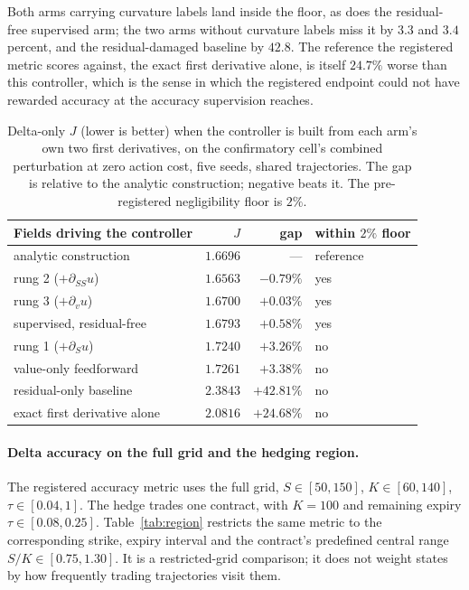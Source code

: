 \documentclass{article}
\begin{document}
Both arms carrying curvature labels land inside the floor, as does the residual-free
supervised arm; the two arms without curvature labels miss it by $3.3$ and $3.4$
percent, and the residual-damaged baseline by $42.8$. The reference the registered
metric scores against, the exact first derivative alone, is itself $24.7\%$ worse
than this controller, which is the sense in which the registered endpoint could
not have rewarded accuracy at the accuracy supervision reaches.

\begin{table}[!htbp]
\caption{Delta-only $J$ (lower is better) when the controller is built from each
arm's own two first derivatives, on the confirmatory cell's combined perturbation
at zero action cost, five seeds,
shared trajectories. The gap is relative to the analytic construction; negative
beats it. The pre-registered negligibility floor is $2\%$.}
\label{tab:mv-s2s}
\centering\footnotesize\setlength{\tabcolsep}{6pt}
\begin{tabular}{@{}lrrl@{}}
\toprule
Fields driving the controller & $J$ & gap & within $2\%$ floor \\
\midrule
analytic construction & $1.6696$ & --- & reference \\
rung 2 ($+\partial_{SS}u$) & $\mathbf{1.6563}$ & $-0.79\%$ & yes \\
rung 3 ($+\partial_v u$) & $1.6700$ & $+0.03\%$ & yes \\
supervised, residual-free & $1.6793$ & $+0.58\%$ & yes \\
rung 1 ($+\partial_S u$) & $1.7240$ & $+3.26\%$ & no \\
value-only feedforward & $1.7261$ & $+3.38\%$ & no \\
residual-only baseline & $2.3843$ & $+42.81\%$ & no \\
\midrule
exact first derivative alone & $2.0816$ & $+24.68\%$ & no \\
\bottomrule
\end{tabular}
\end{table}

\paragraph{Delta accuracy on the full grid and the hedging region.}
The registered accuracy metric uses the full grid, $S\in[50,150]$,
$K\in[60,140]$, $\tau\in[0.04,1]$. The hedge trades one contract, with $K=100$
and remaining expiry $\tau\in[0.08,0.25]$. Table~\ref{tab:region} restricts the
same metric to the corresponding strike, expiry interval and the contract's
predefined central range $S/K\in[0.75,1.30]$. It is a restricted-grid comparison; it does not
weight states by how frequently trading trajectories visit them.
\end{document}
